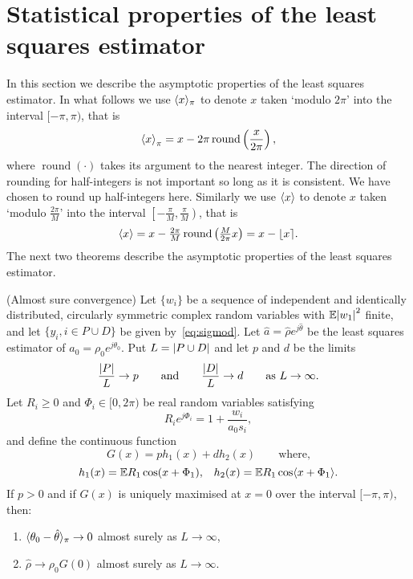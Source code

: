 \documentclass[journal]{IEEEtran}
\begin{document}
\section{Statistical properties of the least squares estimator}\label{sec:stat-prop-least}

In this section we describe the asymptotic properties of the least squares estimator.  In what follows we use $\langle x \rangle_\pi$ to denote $x$ taken `modulo $2\pi$' into the interval $[-\pi, \pi)$, that is
\[
\left\langle x \right\rangle_\pi = x - 2\pi\operatorname{round}\left(\frac{x}{2\pi}\right),
\]
where $\operatorname{round}(\cdot)$ takes its argument to the nearest integer.  The direction of rounding for half-integers is not important so long as it is consistent.  We have chosen to round up half-integers here.  Similarly we use $\langle x \rangle$ to denote $x$ taken `modulo $\tfrac{2\pi}{M}$' into the interval $\left[-\tfrac{\pi}{M}, \tfrac{\pi}{M}\right)$, that is
\[
\left\langle x \right\rangle = x - \tfrac{2\pi}{M}\operatorname{round}\left(\tfrac{M}{2\pi}x\right) = x - {\left\lfloor x \right\rceil}.
\]
The next two theorems describe the asymptotic properties of the least squares estimator.

\begin{theorem}\label{thm:consistency} (Almost sure convergence)
Let $\{w_i\}$ be a sequence of independent and identically distributed, circularly symmetric complex random variables with ${\mathbb E} {\left\vert w_1 \right\vert}^2$ finite, and let $\{y_i, i \in P \cup D\}$ be given by~\eqref{eq:sigmod}.   Let $\hat{a} = \hat{\rho}e^{j\hat{\theta}}$ be the least squares estimator of $a_0 = \rho_0e^{j\theta_0}$. %
Put $L = {\left\vert P \cup D \right\vert}$ and let $p$ and $d$ be the limits
\[
\frac{{\left\vert P \right\vert}}{L} \rightarrow p \qquad \text{and} \qquad \frac{{\left\vert D \right\vert}}{L} \rightarrow d \qquad \text{as $L \rightarrow \infty$.}
\] 
Let $R_i \geq 0$ and $\Phi_i \in [0,2\pi)$ be real random variables satisfying
\begin{equation}\label{eq:RiandPhii}
R_ie^{j\Phi_i} = 1 + \frac{w_i}{a_0 s_i} ,
\end{equation}
and define the continuous function
\[
G(x) = p h_1(x) + d h_2(x) \qquad \text{where,}
\]
\[
h_1(x) = {\mathbb E} R_1 \cos(x + \Phi_1), \;\;\; h_2(x) =  {\mathbb E} R_1 \cos\langle  x + \Phi_1 \rangle.
\]
If $p > 0$ and if $G(x)$ is uniquely maximised at $x = 0$ over the interval $[-\pi,\pi)$, then:
\begin{enumerate}
\item $\langle \theta_0 - \hat{\theta} \rangle_\pi \rightarrow 0$ almost surely as $L \rightarrow \infty$,
\item $\hat{\rho} \rightarrow \rho_0 G(0)$ almost surely as $L \rightarrow \infty$.
\end{enumerate}
\end{theorem}
\end{document}
